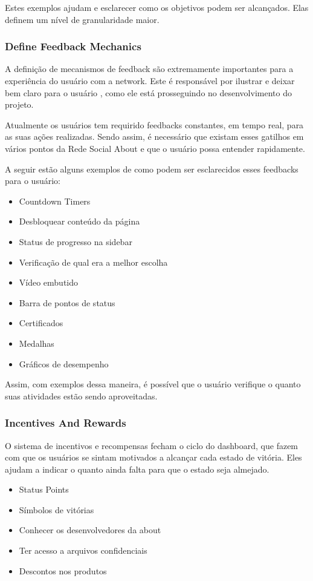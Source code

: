 Estes exemplos ajudam e esclarecer como os objetivos podem ser alcançados. Elas
definem um nível de
granularidade maior.

\subsubsection{Define Feedback Mechanics}
\label{sub:define_feedback_mechanics}
A definição de mecanismos de feedback são extremamente importantes para a experiência do usuário
com a network. Este é responsável por ilustrar e deixar bem claro para o usuário
, como ele está
prosseguindo no desenvolvimento do projeto.

Atualmente os usuários tem requirido feedbacks constantes, em tempo real, para as suas ações
realizadas. Sendo assim, é necessário que existam esses gatilhos em vários pontos da
Rede Social About e que o usuário possa entender rapidamente.

A seguir estão alguns exemplos de como podem ser esclarecidos esses feedbacks para o usuário:

\begin{itemize}
    \item Countdown Timers
    \item Desbloquear conteúdo da página
    \item Status de progresso na sidebar
    \item Verificação de qual era a melhor escolha
    \item Vídeo embutido
    \item Barra de pontos de status
    \item Certificados
    \item Medalhas
    \item Gráficos de desempenho
\end{itemize}

Assim, com exemplos dessa maneira, é possível que o usuário verifique o quanto suas atividades estão
sendo aproveitadas.

\subsubsection{Incentives And Rewards}
\label{sub:incentives_and_rewards}
O sistema de incentivos e recompensas fecham o ciclo do dashboard, que fazem com que
os usuários se sintam motivados a alcançar cada estado de vitória. Eles ajudam a
indicar
o quanto ainda falta para que o estado seja almejado.

\begin{itemize}
    \item Status Points
    \item Símbolos de vitórias
    \item Conhecer os desenvolvedores da about
    \item Ter acesso a arquivos confidenciais
    \item Descontos nos produtos
\end{itemize}

